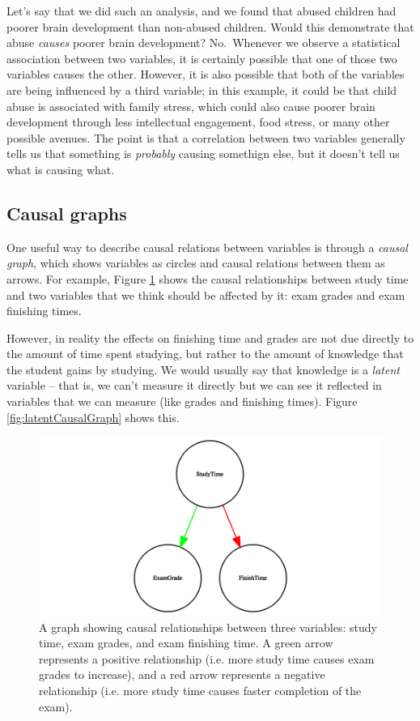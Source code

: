 \documentclass[12pt,]{book}
\theoremstyle{definition}
\theoremstyle{definition}
\theoremstyle{definition}
\theoremstyle{remark}
\begin{document}
Let's say that we did such an analysis, and we found that abused children had poorer brain development than non-abused children. Would this demonstrate that abuse \emph{causes} poorer brain development? No.~Whenever we observe a statistical association between two variables, it is certainly possible that one of those two variables causes the other. However, it is also possible that both of the variables are being influenced by a third variable; in this example, it could be that child abuse is associated with family stress, which could also cause poorer brain development through less intellectual engagement, food stress, or many other possible avenues. The point is that a correlation between two variables generally tells us that something is \emph{probably} causing somethign else, but it doesn't tell us what is causing what.

\hypertarget{causal-graphs}{%
\subsection{Causal graphs}\label{causal-graphs}}

One useful way to describe causal relations between variables is through a \emph{causal graph}, which shows variables as circles and causal relations between them as arrows. For example, Figure \ref{fig:simpleCausalGraph} shows the causal relationships between study time and two variables that we think should be affected by it: exam grades and exam finishing times.

However, in reality the effects on finishing time and grades are not due directly to the amount of time spent studying, but rather to the amount of knowledge that the student gains by studying. We would usually say that knowledge is a \emph{latent} variable -- that is, we can't measure it directly but we can see it reflected in variables that we can measure (like grades and finishing times). Figure \ref{fig:latentCausalGraph} shows this.

\begin{figure}
\includegraphics[width=13.33in,height=0.5\textheight]{images/dag_example} \caption{A graph showing causal relationships between three variables: study time, exam grades, and exam finishing time.  A green arrow represents a positive relationship (i.e. more study time causes exam grades to increase), and a red arrow represents a negative relationship (i.e. more study time causes faster completion of the exam).}\label{fig:simpleCausalGraph}
\end{figure}
\end{document}
